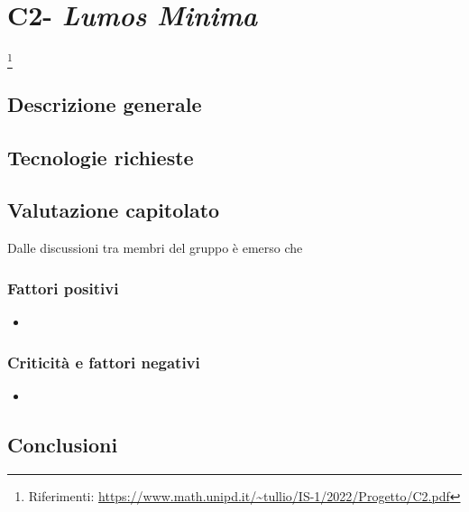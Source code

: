 
\renewcommand{\capName}{\textit{Lumos Minima}} %
\renewcommand{\capCode}{C2} %
\renewcommand{\capLink}{https://www.math.unipd.it/~tullio/IS-1/2022/Progetto/C2.pdf} %
\renewcommand{\capProposer}{ImolaInformatica} %


\section{\capCode - \capName} \footnote{Riferimenti: \url{\capLink}}
\subsection{Descrizione generale}

\subsection{Tecnologie richieste}

\subsection{Valutazione capitolato}
Dalle discussioni tra membri del gruppo è emerso che

\subsubsection{Fattori positivi}

\begin{itemize}
    \item 
\end{itemize}

\subsubsection{Criticità e fattori negativi}

\begin{itemize}
    \item 
\end{itemize}

\subsection{Conclusioni}